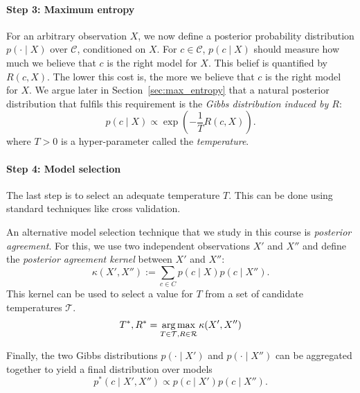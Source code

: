 \paragraph{Step 3: Maximum entropy} For an arbitrary observation $X$, we now define a posterior probability distribution $p(\cdot \mid X)$ over $\mathcal{C}$, conditioned on $X$. For $c \in \mathcal{C}$, $p(c \mid X)$ should measure how much we believe that $c$ is the right model for $X$. This belief is quantified by $R(c, X)$. The lower this cost is, the more we believe that $c$ is the right model for $X$. We argue later in Section~\ref{sec:max_entropy} that a natural posterior distribution that fulfils this requirement is the \emph{Gibbs distribution induced by $R$}:
%
\begin{equation}
p(c \mid X) \propto \exp\left(- \frac{1}{T} R(c, X)\right).
\label{eq:max_ent_dist}
\end{equation}
%
where $T > 0$ is a hyper-parameter called the \emph{temperature}.

\paragraph{Step 4: Model selection} The last step is to select an adequate temperature $T$. This can be done using standard techniques like cross validation. 

An alternative model selection technique that we study in this course is \emph{posterior agreement}. For this, we use two independent observations $X'$ and $X''$ and define the \emph{posterior agreement kernel} between $X'$ and $X''$:
%
\begin{equation}
\kappa(X', X'') := \sum_{c \in C} p(c \mid X) p(c \mid X'').
\label{eq:kernel_post_agr}
\end{equation}
%
This kernel can be used to select a value for $T$ from a set of candidate temperatures $\mathcal{T}$. 
%
\begin{equation}
T^*, R^* = \operatorname*{arg\,max}_{T \in \mathcal{T}, R \in \mathcal{R}} \kappa(X', X'')
\end{equation}

Finally, the two Gibbs distributions $p(\cdot \mid X')$ and $p(\cdot \mid X'')$ can be aggregated together to yield a final distribution over models
%
\begin{equation}
p^*(c \mid X', X'') \propto p(c \mid X')p(c \mid X'').
\label{eq:final_post_dist}
\end{equation}

